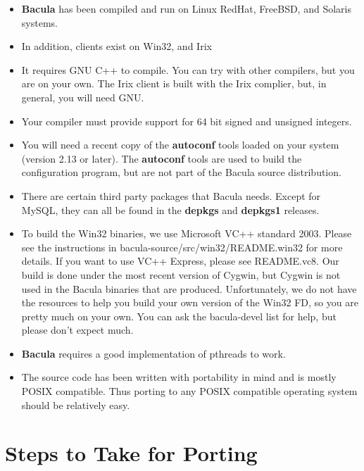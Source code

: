 \begin{itemize}
\item {\bf Bacula} has been compiled and run on Linux RedHat, FreeBSD,  and
   Solaris systems.
\item In addition, clients exist on Win32, and Irix
\item It requires GNU C++ to compile. You can try with other compilers, but
   you are on your own. The Irix client is built with the Irix complier,  but, in
   general, you will need GNU.
\item Your compiler must provide support for 64 bit signed and unsigned
   integers.
\item You will need a recent copy of the {\bf autoconf} tools loaded  on your
   system (version 2.13 or later). The {\bf autoconf} tools  are used to build
   the configuration program, but are not part of  the Bacula source
distribution.
\item There are certain third party packages that Bacula needs. Except  for
   MySQL, they can all be found in the {\bf depkgs} and  {\bf depkgs1} releases.
\item To build the Win32 binaries, we use Microsoft VC++ standard
   2003. Please see the instructions in
   bacula-source/src/win32/README.win32 for more details. If you
   want to use VC++ Express, please see README.vc8. Our build is
   done under the most recent version of Cygwin, but Cygwin is
   not used in the Bacula binaries that are produced.
   Unfortunately, we do not have the resources to help you build
   your own version of the Win32 FD, so you are pretty much on
   your own. You can ask the bacula-devel list for help, but
   please don't expect much.
\item {\bf Bacula} requires a good implementation of pthreads to work.
\item The source code has been written with portability in mind and is  mostly
   POSIX compatible. Thus porting to any POSIX compatible operating  system
   should be relatively easy.
\end{itemize}

\section{Steps to Take for Porting}

